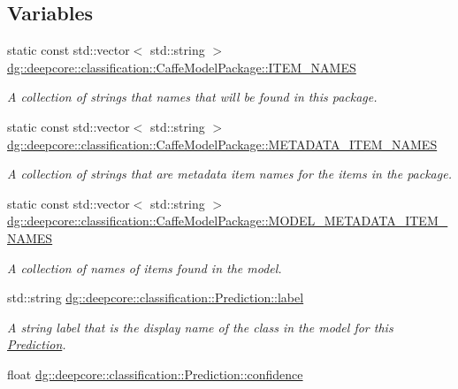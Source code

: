 \subsection*{Variables}
\begin{DoxyCompactItemize}
\item 
static const std\+::vector$<$ std\+::string $>$ \hyperlink{group___classification_module_ga44a441d13d149f42cc659ee92e83fdb4}{dg\+::deepcore\+::classification\+::\+Caffe\+Model\+Package\+::\+I\+T\+E\+M\+\_\+\+N\+A\+M\+ES}
\begin{DoxyCompactList}\small\item\em A collection of strings that names that will be found in this package. \end{DoxyCompactList}\item 
static const std\+::vector$<$ std\+::string $>$ \hyperlink{group___classification_module_ga0d8174bf9f1ba89932caa3abb73aa4cb}{dg\+::deepcore\+::classification\+::\+Caffe\+Model\+Package\+::\+M\+E\+T\+A\+D\+A\+T\+A\+\_\+\+I\+T\+E\+M\+\_\+\+N\+A\+M\+ES}
\begin{DoxyCompactList}\small\item\em A collection of strings that are metadata item names for the items in the package. \end{DoxyCompactList}\item 
static const std\+::vector$<$ std\+::string $>$ \hyperlink{group___classification_module_ga66d66cfd2c51d9d01f001fc6d55afcaf}{dg\+::deepcore\+::classification\+::\+Caffe\+Model\+Package\+::\+M\+O\+D\+E\+L\+\_\+\+M\+E\+T\+A\+D\+A\+T\+A\+\_\+\+I\+T\+E\+M\+\_\+\+N\+A\+M\+ES}
\begin{DoxyCompactList}\small\item\em A collection of names of items found in the model. \end{DoxyCompactList}\item 
std\+::string \hyperlink{group___classification_module_gae1374a898e2380401c2e671786e69ff1}{dg\+::deepcore\+::classification\+::\+Prediction\+::label}
\begin{DoxyCompactList}\small\item\em A string label that is the display name of the class in the model for this \hyperlink{structdg_1_1deepcore_1_1classification_1_1_prediction}{Prediction}. \end{DoxyCompactList}\item 
float \hyperlink{group___classification_module_gae7ab1c3906399dab0ee969ffc521bcfb}{dg\+::deepcore\+::classification\+::\+Prediction\+::confidence}

\end{DoxyCompactItemize}
